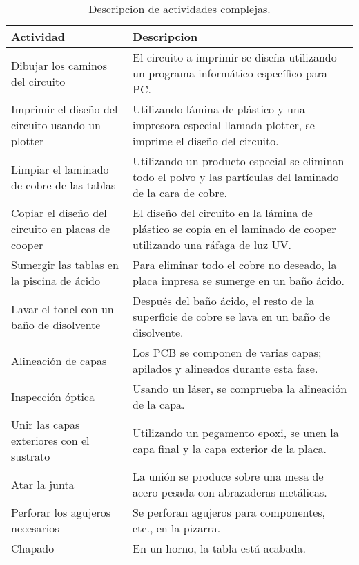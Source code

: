 \documentclass[a4paper]{article}
\begin{document}
\begin{table}[t]
\caption{\label{tab:tabla ejemplo}Descripcion de actividades complejas.}
\begin{center}
\begin{tabular}{ | m{2cm} | m{5cm} | }
\hline Actividad & Descripcion \\ \hline
Dibujar los caminos del circuito & El circuito a imprimir se diseña utilizando un programa informático específico para PC. \\ \hline
Imprimir el diseño del circuito usando un plotter & Utilizando lámina de plástico y una impresora especial llamada plotter, se imprime el diseño del circuito. \\ \hline
Limpiar el laminado de cobre de las tablas & Utilizando un producto especial se eliminan todo el polvo y las partículas del laminado de la cara de cobre. \\ \hline
Copiar el diseño del circuito en placas de cooper & El diseño del circuito en la lámina de plástico se copia en el laminado de cooper utilizando una ráfaga de luz UV.\\ \hline
Sumergir las tablas en la piscina de ácido & Para eliminar todo el cobre no deseado, la placa impresa se sumerge en un baño ácido.\\ \hline
Lavar el tonel con un baño de disolvente & Después del baño ácido, el resto de la superficie de cobre se lava en un baño de disolvente.\\ \hline
Alineación de capas & Los PCB se componen de varias capas; apilados y alineados durante esta fase.\\ \hline
Inspección óptica & Usando un láser, se comprueba la alineación de la capa.\\ \hline
Unir las capas exteriores con el sustrato & Utilizando un pegamento epoxi, se unen la capa final y la capa exterior de la placa.\\ \hline
Atar la junta & La unión se produce sobre una mesa de acero pesada con abrazaderas metálicas.\\ \hline
Perforar los agujeros necesarios & Se perforan agujeros para componentes, etc., en la pizarra.\\ \hline
Chapado & En un horno, la tabla está acabada.\\ \hline

\end{tabular}
\end{center}
\end{table}
\end{document}
